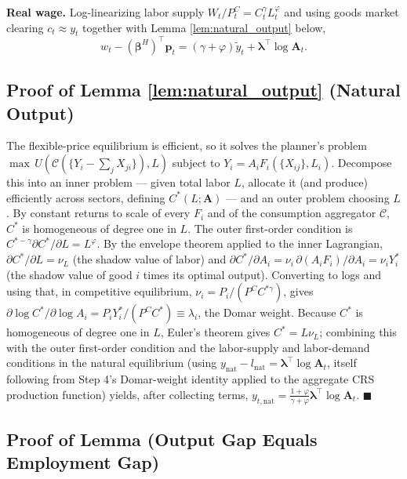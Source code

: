 \documentclass[12pt]{article}
\begin{document}
\textbf{Real wage.} Log-linearizing labor supply $W_t/P_t^C=C_t^\gamma L_t^\varphi$ and using goods
market clearing $c_t\approx y_t$ together with Lemma \ref{lem:natural_output} below,
\begin{equation}
    w_t - (\bm\beta^H)^\top\bm p_t = (\gamma+\varphi)\tilde y_t + \bm\lambda^\top\log\mathbf A_t.
    \label{app:eq:realwage}
\end{equation}

\subsection{Proof of Lemma \ref{lem:natural_output} (Natural Output)}

The flexible-price equilibrium is efficient, so it solves the planner's problem
$\max\, U(\mathcal C(\{Y_i-\sum_jX_{ji}\}),L)$ subject to $Y_i=A_iF_i(\{X_{ij}\},L_i)$. Decompose this
into an inner problem --- given total labor $L$, allocate it (and produce) efficiently across sectors,
defining $C^*(L;\mathbf A)$ --- and an outer problem choosing $L$. By constant returns to scale of
every $F_i$ and of the consumption aggregator $\mathcal C$, $C^*$ is homogeneous of degree one in $L$.
The outer first-order condition is $C^{*-\gamma}\partial C^*/\partial L = L^\varphi$. By the envelope
theorem applied to the inner Lagrangian, $\partial C^*/\partial L=\nu_L$ (the shadow value of labor)
and $\partial C^*/\partial A_i = \nu_i\,\partial(A_iF_i)/\partial A_i = \nu_i Y_i^*$ (the shadow value
of good $i$ times its optimal output). Converting to logs and using that, in competitive equilibrium,
$\nu_i=P_i/(P^CC^{*\gamma})$, gives $\partial\log C^*/\partial\log A_i = P_iY_i^*/(P^CC^*)\equiv
\lambda_i$, the Domar weight. Because $C^*$ is homogeneous of degree one in $L$, Euler's theorem gives
$C^*=L\nu_L$; combining this with the outer first-order condition and the labor-supply and
labor-demand conditions in the natural equilibrium (using $y_{\mathrm{nat}}-l_{\mathrm{nat}}=
\bm\lambda^\top\log\mathbf A_t$, itself following from Step 4's Domar-weight identity applied to the
aggregate CRS production function) yields, after collecting terms,
$y_{t,\mathrm{nat}}=\tfrac{1+\varphi}{\gamma+\varphi}\bm\lambda^\top\log\mathbf A_t$. $\blacksquare$

\subsection{Proof of Lemma (Output Gap Equals Employment Gap)}
\label{app:lem2}
\end{document}
